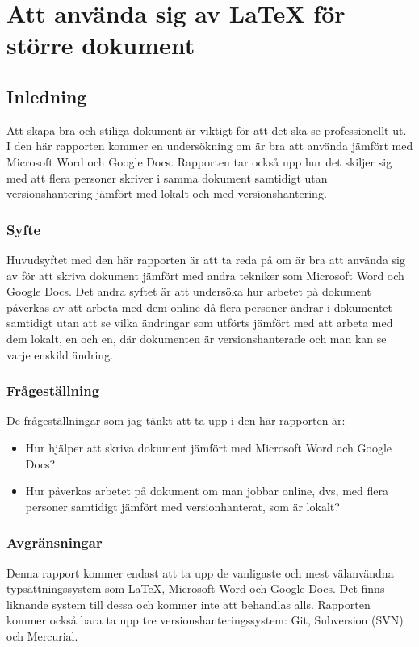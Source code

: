 \chapter{Att använda sig av LaTeX för större dokument}
\label{cha:indiv-report-tuhkala}

\section{Inledning}
\label{sec:introduction-tuhkala}
Att skapa bra och stiliga dokument är viktigt för att det ska se professionellt ut. I den här rapporten kommer en undersökning om \latex är bra att använda jämfört med Microsoft Word och Google Docs. Rapporten tar också upp hur det skiljer sig med att flera personer skriver i samma dokument samtidigt utan versionshantering jämfört med lokalt och med versionshantering.

\subsection{Syfte}
\label{sec:purpose-tuhkala}
Huvudsyftet med den här rapporten är att ta reda på om \latex är bra att använda sig av för att skriva dokument jämfört med andra tekniker som Microsoft Word och Google Docs. Det andra syftet är att undersöka hur arbetet på dokument påverkas av att arbeta med dem online då flera personer ändrar i dokumentet samtidigt utan att se vilka ändringar som utförts jämfört med att arbeta med dem lokalt, en och en, där dokumenten är versionshanterade och man kan se varje enskild ändring.

\subsection{Frågeställning}
\label{sec:issue-tuhkala}
De frågeställningar som jag tänkt att ta upp i den här rapporten är:

\begin{itemize}
	\item Hur hjälper \latex att skriva dokument jämfört med Microsoft Word och Google Docs?
	\item Hur påverkas arbetet på dokument om man jobbar online, dvs, med flera personer samtidigt jämfört med versionhanterat, som är lokalt?
\end{itemize}

\subsection{Avgränsningar}
Denna rapport kommer endast att ta upp de vanligaste och mest välanvändna typsättningssystem som LaTeX, Microsoft Word och Google Docs. Det finns liknande system till dessa och kommer inte att behandlas alls. Rapporten kommer också bara ta upp tre versionshanteringssystem: Git, Subversion (SVN) och Mercurial.

